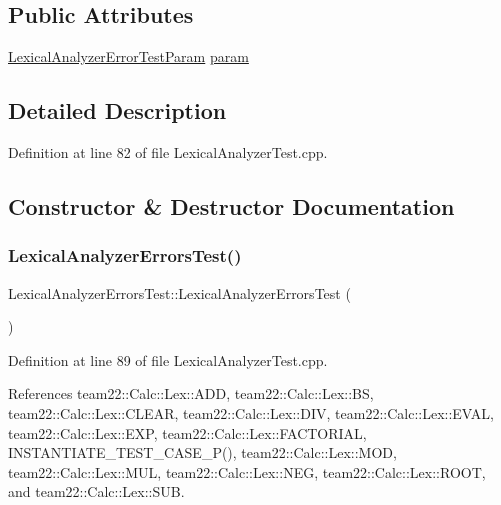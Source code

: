 \subsection*{Public Attributes}
\begin{DoxyCompactItemize}
\item 
\hyperlink{struct_lexical_analyzer_error_test_param}{Lexical\+Analyzer\+Error\+Test\+Param} \hyperlink{struct_lexical_analyzer_errors_test_a61a8ef433e2118a8723bfd8f99029126}{param}
\end{DoxyCompactItemize}


\subsection{Detailed Description}


Definition at line 82 of file Lexical\+Analyzer\+Test.\+cpp.



\subsection{Constructor \& Destructor Documentation}
\mbox{\label{struct_lexical_analyzer_errors_test_ae4fdca5d1de2494ca722d4683e62bc16}} 
\subsubsection{\texorpdfstring{Lexical\+Analyzer\+Errors\+Test()}{LexicalAnalyzerErrorsTest()}}
{\footnotesize\ttfamily Lexical\+Analyzer\+Errors\+Test\+::\+Lexical\+Analyzer\+Errors\+Test (\begin{DoxyParamCaption}{ }\end{DoxyParamCaption})\hspace{0.3cm}{\ttfamily [inline]}}



Definition at line 89 of file Lexical\+Analyzer\+Test.\+cpp.



References team22\+::\+Calc\+::\+Lex\+::\+A\+DD, team22\+::\+Calc\+::\+Lex\+::\+BS, team22\+::\+Calc\+::\+Lex\+::\+C\+L\+E\+AR, team22\+::\+Calc\+::\+Lex\+::\+D\+IV, team22\+::\+Calc\+::\+Lex\+::\+E\+V\+AL, team22\+::\+Calc\+::\+Lex\+::\+E\+XP, team22\+::\+Calc\+::\+Lex\+::\+F\+A\+C\+T\+O\+R\+I\+AL, I\+N\+S\+T\+A\+N\+T\+I\+A\+T\+E\+\_\+\+T\+E\+S\+T\+\_\+\+C\+A\+S\+E\+\_\+\+P(), team22\+::\+Calc\+::\+Lex\+::\+M\+OD, team22\+::\+Calc\+::\+Lex\+::\+M\+UL, team22\+::\+Calc\+::\+Lex\+::\+N\+EG, team22\+::\+Calc\+::\+Lex\+::\+R\+O\+OT, and team22\+::\+Calc\+::\+Lex\+::\+S\+UB.



